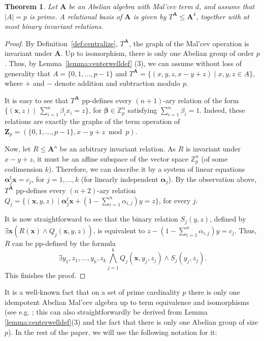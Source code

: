 \documentclass[12pt]{amsart}
\newtheorem{theorem}{Theorem}[section]
\theoremstyle{definition}
\theoremstyle{definition}
\newcommand{\alg}[1]{\mathbf{#1}}
\newcommand{\algA}{\alg{A}}
\begin{document}
\begin{theorem} \label{thm:Zp}
Let $\alg{A}$ be an Abelian algebra with Mal'cev term $d$, and assume that $|A| = p$ is prime. A relational basis of $\alg{A}$ is given by $T^{\algA} \leq\alg{A}^4$, together with at most binary invariant relations.
\end{theorem}


\begin{proof}
By Definition~\ref{def:centralize}, $T^{\algA}$, the graph of the Mal'cev operation is invariant under $\algA$. Up to isomorphism, there is only one Abelian group of order $p$. Thus, by Lemma~\ref{lemma:centerwelldef} (3), we can assume without loss of generality that $A = \{0,1,\ldots,p-1\}$ and $T^{\algA} = \{(x,y,z,x-y+z) \mid x,y,z\in A\}$, where $+$ and $-$ denote addition and subtraction modulo $p$.

It is easy to see that $T^{\algA}$ pp-defines every $(n+1)$-ary relation of the form $\{ (\boldsymbol{x},z) \mid \ \sum_{i=1}^n \beta_ix_i = z \}$, for $\bm{\beta} \in \mathbb Z_p^n$ satisfying $\sum_{i=1}^n \beta_i = 1$. Indeed, these relations are exactly the graphs of the term operation of $\mathbf Z_p = (\{0,1,\ldots,p-1\}, x-y+z \bmod p)$.

Now, let $R \leq \alg{A}^n$ be an arbitrary invariant relation. As $R$ is invariant under $x-y+z$, it must be an affine subspace of the vector space $\mathbb{Z}_p^n$ (of some codimension $k$). Therefore, we can describe it by a system of linear equations $ \bm{\alpha}_j^t \boldsymbol{x} = c_j$,
 for $j = 1,\ldots,k$ (for linearly independent $\bm{\alpha}_j$). By the observation above, $T^\algA$ pp-defines every $(n+2)$-ary relation $Q_j = \{(\boldsymbol{x},y,z) \mid \bm{\alpha}_j^t \boldsymbol{x}  + (1-\sum_{i=1}^n \alpha_{i,j}) y = z \}$, for every $j$.

It is now straightforward to see that the binary relation $S_j(y,z)$, defined by $\exists \boldsymbol{x}( R(\boldsymbol{x}) \land Q_j(\boldsymbol{x},y,z))$, is equivalent to $z-(1-\sum_{i=1}^n \alpha_{i,j}) y = c_j$. Thus, $R$ can be pp-defined by the formula
\[\exists y_1,z_1,\ldots,y_k,z_k \bigwedge_{j = 1}^k Q_j(\boldsymbol{x},y_j,z_j) \land S_j(y_j,z_j).\]
This finishes the proof.
\end{proof}


It is a well-known fact that on a set of prime cardinality $p$ there is only one idempotent Abelian Mal'cev algebra up to term equivalence and isomorphisms (see e.g. \cite{BagyinskiDemetrovics82}; this can also straightforwardly be derived from Lemma \ref{lemma:centerwelldef}(3) and the fact that there is only one Abelian group of size $p$). In the rest of the paper, we will use the following notation for it:
\end{document}
